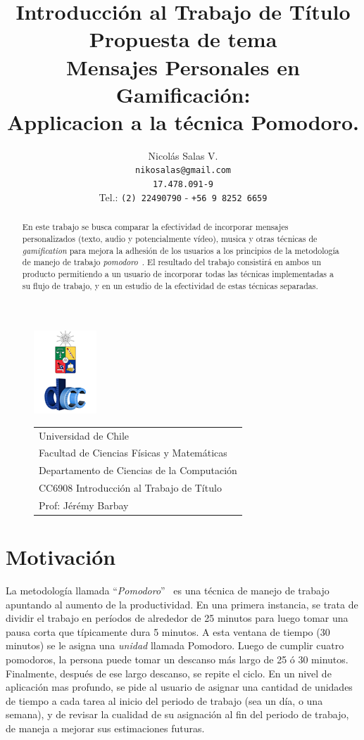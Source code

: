 \documentclass[12pt,letterpaper]{report}
\title{
{\small Introducción al Trabajo de Título \\  Propuesta de tema}
\\
{\Huge 
Mensajes Personales en Gamificación:\\
Applicacion a la técnica  Pomodoro.} 
}
\author{Nicolás Salas V.\\\texttt{nikosalas@gmail.com}\\\texttt{17.478.091-9}\\Tel.: \texttt{(2) 22490790} - \texttt{+56 9 8252 6659}}
\begin{document}
\begin{figure}[t]
\includegraphics[scale=0.83]{logo.png}
\begin{tabular}{l}
\small Universidad de Chile\\
\small Facultad de Ciencias Físicas y Matemáticas\\
\small Departamento de Ciencias de la Computación\\
\small CC6908 Introducción al Trabajo de Título\\
\small Prof: Jérémy Barbay
\vspace{2.3cm}
\end{tabular}
\end{figure}
\maketitle

\begin{abstract}
En este trabajo se busca comparar la efectividad de incorporar mensajes personalizados (texto, audio y potencialmente vídeo), musica y otras técnicas de \emph{gamification} para mejora la adhesión de los usuarios a los principios de la metodología de manejo de trabajo \emph{pomodoro}~\cite{cirillo2009pomodoro}. El resultado del trabajo consistirá en ambos un producto permitiendo a un usuario de incorporar todas las técnicas implementadas a su flujo de trabajo, y en un estudio de la efectividad de estas técnicas separadas.
\end{abstract}

\tableofcontents
\newpage

\hypertarget{motivaciuxf3n}{%
\section{Motivación}\label{motivaciuxf3n}}

La metodología llamada ``\emph{Pomodoro}''~\cite{cirillo2009pomodoro} es una técnica de manejo de trabajo apuntando al aumento de la productividad. En una primera instancia, se trata de dividir el trabajo en períodos de alrededor de 25 minutos para luego tomar una pausa corta que típicamente dura 5 minutos. A esta ventana de tiempo (30 minutos) se le asigna una \emph{unidad} llamada Pomodoro.  Luego de cumplir cuatro pomodoros, la persona puede tomar un descanso más largo de 25 ó 30 minutos. Finalmente, después de ese largo descanso, se repite el ciclo. En un nivel de aplicación mas profundo, se pide al usuario de asignar una cantidad de unidades de tiempo a cada tarea al inicio del periodo de trabajo (sea un día, o una semana), y de revisar la cualidad de su asignación al fin del periodo de trabajo, de maneja a mejorar sus estimaciones futuras.
\end{document}
